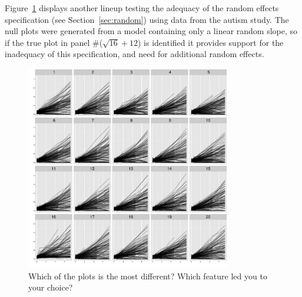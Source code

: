 \documentclass[12pt]{article} %
\newcommand{\hhnote}[1]{\todo[inline,color=orange!40]{#1}}
\begin{document}




Figure~\ref{fig:autism-ranef} displays another lineup testing the adequacy of the random effects specification  (see Section~\ref{sec:random}) using data from the autism study. The null plots were generated from a model containing only a linear random slope, so if the true plot in panel \#($\sqrt{16} + 12$) is identified it provides support for the inadequacy of this specification, and need for additional random effects. %

\begin{figure}
	\centering
	\includegraphics[width=0.8\textwidth]{autism-fanned2-16.pdf}
	\caption{\label{fig:autism-ranef} Which of the plots is the most different? Which feature led you to your choice? }
\end{figure}

\end{document}
